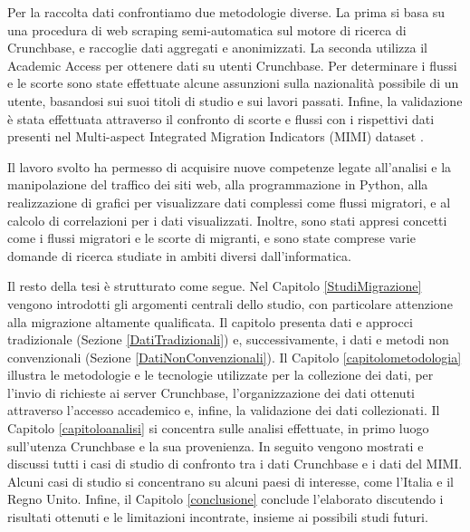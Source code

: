 Per la raccolta dati confrontiamo due metodologie diverse. La prima si basa su una procedura di web scraping semi-automatica sul motore di ricerca di Crunchbase, e raccoglie dati aggregati e anonimizzati. La seconda utilizza il Academic Access per ottenere dati su utenti Crunchbase. Per determinare i flussi e le scorte sono state effettuate alcune assunzioni sulla nazionalità possibile di un utente, basandosi sui suoi titoli di studio e sui lavori passati.
Infine, la validazione è stata effettuata attraverso il confronto di scorte e flussi con i rispettivi dati presenti nel Multi-aspect Integrated Migration Indicators (MIMI) dataset \cite{MIMIDOC}. 


Il lavoro svolto ha permesso di acquisire nuove competenze legate all'analisi e la manipolazione del traffico dei siti web, alla programmazione in Python, alla realizzazione di grafici per visualizzare dati complessi come flussi migratori, e al calcolo di correlazioni per i dati visualizzati. Inoltre, sono stati appresi concetti come i flussi migratori e le scorte di migranti, e sono state comprese varie domande di ricerca studiate in ambiti diversi dall'informatica.

Il resto della tesi è strutturato come segue.
Nel Capitolo \ref{StudiMigrazione} vengono introdotti gli argomenti centrali dello studio, con particolare attenzione alla migrazione altamente qualificata. Il capitolo presenta dati e approcci tradizionale (Sezione \ref{DatiTradizionali}) e, successivamente, i dati e metodi non convenzionali (Sezione \ref{DatiNonConvenzionali}). 
Il Capitolo \ref{capitolometodologia} illustra le metodologie e le tecnologie utilizzate per la collezione dei dati, per l'invio di richieste ai server Crunchbase, l'organizzazione dei dati ottenuti attraverso l'accesso accademico e, infine, la validazione dei dati collezionati. 
Il Capitolo \ref{capitoloanalisi} si concentra sulle analisi effettuate, in primo luogo sull'utenza Crunchbase e la sua provenienza. In seguito vengono mostrati e discussi tutti i casi di studio di confronto tra i dati Crunchbase e i dati del MIMI. Alcuni casi di studio si concentrano su alcuni paesi di interesse, come l'Italia e il Regno Unito. 
Infine, il Capitolo \ref{conclusione} conclude l'elaborato discutendo i risultati ottenuti e  le limitazioni incontrate, insieme ai possibili studi futuri.